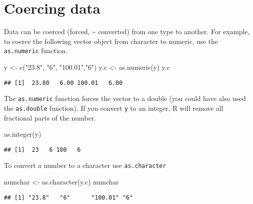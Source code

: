 \documentclass[
]{article}
\newenvironment{Shaded}{\begin{snugshade}}{\end{snugshade}}
\newcommand{\FunctionTok}[1]{\textcolor[rgb]{0.00,0.00,0.00}{#1}}
\newcommand{\NormalTok}[1]{#1}
\newcommand{\OtherTok}[1]{\textcolor[rgb]{0.56,0.35,0.01}{#1}}
\newcommand{\StringTok}[1]{\textcolor[rgb]{0.31,0.60,0.02}{#1}}
\begin{document}
\hypertarget{coercing-data}{%
\section{Coercing data}\label{coercing-data}}

Data can be coerced (forced, \textasciitilde{} converted) from one type
to another. For example, to coerce the following vector object from
character to numeric, use the \texttt{as.numeric} function.

\begin{Shaded}
\begin{Highlighting}[]
\NormalTok{y   }\OtherTok{\textless{}{-}} \FunctionTok{c}\NormalTok{(}\StringTok{"23.8"}\NormalTok{, }\StringTok{"6"}\NormalTok{, }\StringTok{"100.01"}\NormalTok{,}\StringTok{"6"}\NormalTok{)}
\NormalTok{y.c }\OtherTok{\textless{}{-}} \FunctionTok{as.numeric}\NormalTok{(y)}
\NormalTok{y.c}
\end{Highlighting}
\end{Shaded}

\begin{verbatim}
## [1]  23.80   6.00 100.01   6.00
\end{verbatim}

The \texttt{as.numeric} function forces the vector to a double (you
could have also used the \texttt{as.double} function). If you convert
\texttt{y} to an integer, R will remove all fractional parts of the
number.

\begin{Shaded}
\begin{Highlighting}[]
\FunctionTok{as.integer}\NormalTok{(y)}
\end{Highlighting}
\end{Shaded}

\begin{verbatim}
## [1]  23   6 100   6
\end{verbatim}

To convert a number to a character use \texttt{as.character}

\begin{Shaded}
\begin{Highlighting}[]
\NormalTok{numchar }\OtherTok{\textless{}{-}} \FunctionTok{as.character}\NormalTok{(y.c)}
\NormalTok{numchar}
\end{Highlighting}
\end{Shaded}

\begin{verbatim}
## [1] "23.8"   "6"      "100.01" "6"
\end{verbatim}
\end{document}
